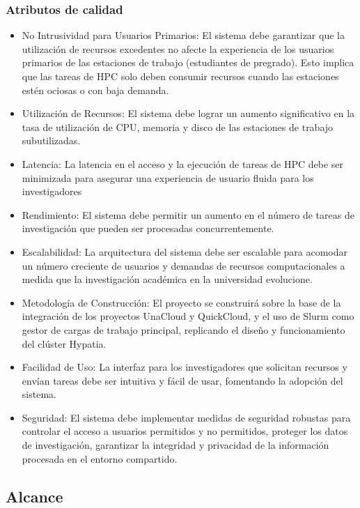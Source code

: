 \subsubsection{Atributos de calidad}
\begin{itemize}
    \item No Intrusividad para Usuarios Primarios: El sistema debe garantizar que la utilización de recursos excedentes no afecte la experiencia de los usuarios primarios de las estaciones de trabajo (estudiantes de pregrado). Esto implica que las tareas de HPC solo deben consumir recursos cuando las estaciones estén ociosas o con baja demanda.
    \item Utilización de Recursos: El sistema debe lograr un aumento significativo en la tasa de utilización de CPU, memoria y disco de las estaciones de trabajo subutilizadas.
    \item Latencia: La latencia en el acceso y la ejecución de tareas de HPC debe ser minimizada para asegurar una experiencia de usuario fluida para los investigadores
    \item Rendimiento: El sistema debe permitir un aumento en el número de tareas de investigación que pueden ser procesadas concurrentemente.
    \item Escalabilidad: La arquitectura del sistema debe ser escalable para acomodar un número creciente de usuarios y demandas de recursos computacionales a medida que la investigación académica en la universidad evolucione.
    \item Metodología de Construcción: El proyecto se construirá sobre la base de la integración de los proyectos UnaCloud y QuickCloud, y el uso de Slurm como gestor de cargas de trabajo principal, replicando el diseño y funcionamiento del clúster Hypatia.
    \item Facilidad de Uso: La interfaz para los investigadores que solicitan recursos y envían tareas debe ser intuitiva y fácil de usar, fomentando la adopción del sistema.
    \item Seguridad: El sistema debe implementar medidas de seguridad robustas para controlar el acceso a usuarios permitidos y no permitidos, proteger los datos de investigación, garantizar la integridad y privacidad de la información procesada en el entorno compartido. 
\end{itemize}
\subsection{Alcance}
